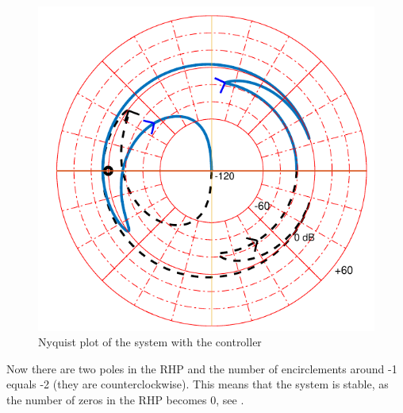 \begin{figure}[H] 
	\centering 
	\includegraphics[scale=0.46]{figures/nyquistController}	
	\caption{Nyquist plot of the system with the controller}
	\label{nyquistController}
\end{figure}

Now there are two poles in the RHP and the number of encirclements around -1 equals -2 (they are counterclockwise). 
This means that the system is stable, as the number of zeros in the RHP becomes 0, see .